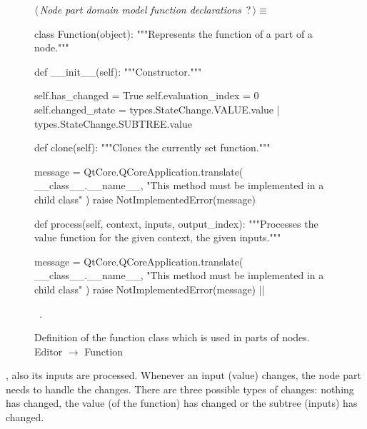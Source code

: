 \documentclass[%
    a4paper,    %
    justified,  %
    nobib,      %
    openany     %
]{tufte-book}
\begin{document}
\begin{figure}
\begin{flushleft} \small
\begin{minipage}{\linewidth}\label{scrap117}\raggedright\small
{} $\langle\,${\itshape Node part domain model function declarations}\nobreak\ {\footnotesize {?}}$\,\rangle\equiv$
\vspace{-1ex}
\begin{pythoncode}
class Function(object):
    """Represents the function of a part of a node."""

    def __init__(self):
        """Constructor."""

        self.has_changed = True
        self.evaluation_index = 0
        self.changed_state = types.StateChange.VALUE.value | types.StateChange.SUBTREE.value

    def clone(self):
        """Clones the currently set function."""

        message = QtCore.QCoreApplication.translate(
            __class__.__name__,
            "This method must be implemented in a child class"
        )
        raise NotImplementedError(message)

    def process(self, context, inputs, output_index):
        """Processes the value function for the given context, the given
        inputs."""

        message = QtCore.QCoreApplication.translate(
            __class__.__name__,
            "This method must be implemented in a child class"
        )
        raise NotImplementedError(message)
|\NWsep|
\end{pythoncode}
\vspace{1.5ex}
\footnotesize
\begin{list}{}{\setlength{\itemsep}{-\parsep}\setlength{\itemindent}{-\leftmargin}}
\item \NWtxtMacroRefIn\ .

\item{}
\end{list}
\end{minipage}\vspace{4ex}
\end{flushleft}
\caption{Definition of the function class which is used in parts of nodes.
  \newline{}\newline{}Editor $\rightarrow$ Function}
\label{editor:lst:function}
\end{figure}

, also its inputs are
processed. Whenever an input (value) changes, the node part needs to handle the
changes. There are three possible types of changes: nothing has changed, the
value (of the function) has changed or the subtree (inputs) has changed.
\end{document}
